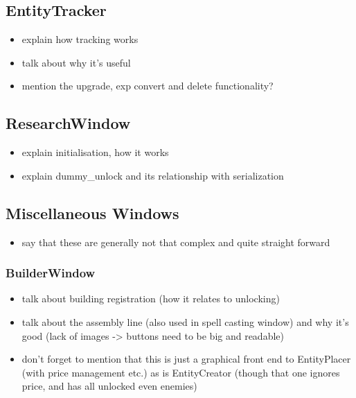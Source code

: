 \subsection{EntityTracker}

\begin{itemize}
    \item explain how tracking works
    \item talk about why it's useful
    \item mention the upgrade, exp convert and delete functionality?
\end{itemize}

\subsection{ResearchWindow}

\begin{itemize}
    \item explain initialisation, how it works
    \item explain dummy\_unlock and its relationship with serialization
\end{itemize}

\subsection{Miscellaneous Windows}

\begin{itemize}
    \item say that these are generally not that complex and quite straight forward
\end{itemize}

\subsubsection{BuilderWindow}

\begin{itemize}
    \item talk about building registration (how it relates to unlocking)
    \item talk about the assembly line (also used in spell casting window)
        and why it's good (lack of images -> buttons need to be big and readable)
    \item don't forget to mention that this is just a graphical front end
        to EntityPlacer (with price management etc.) as is EntityCreator (though
        that one ignores price, and has all unlocked even enemies)
\end{itemize}

